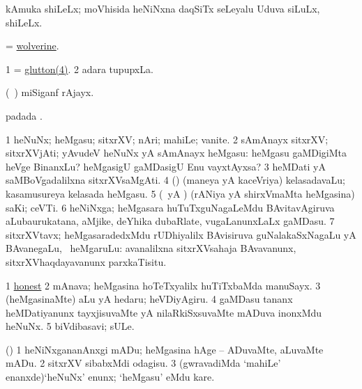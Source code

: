 \bentry
{} 
\gl{\nA}
\expl{}
\bmng
kAmuka shiLeLx; moVhisida heNiNxna daqSiTx seLeyalu Uduva siLuLx, shiLeLx. 
\emng
\eentry

\bentry
{} 
\gl{\nA}
\expl{}
\bmng
= \hyperlink{wolverine}{wolverine}. 
\emng
\eentry

\bentry
{} 
\gl{\nA}
\expl{}
\bmng
\bnum
\num{1} = \hyperref{kandict_g.pdf}{G}{glutton(4)}{glutton(4)}. 
\num{2} adara tupupxLa. 
\enum
\emng
\eentry

\bentry
{} 
\gl{\nA}
\expl{}
\bmng
(\kanu\ \ame) miSiganf rAjayx. 
\emng
\eentry

\bentry
{} 
\gl{\nA}
\expl{}
\bmng
{} padada \bava. 
\emng
\eentry

\bentry
{} 
\gl{\nA}
\bmng
\bnum
\num{1} heNuNx; heMgasu; sitxrXV; nAri; mahiLe; vanite. 
\num{2} sAmAnayx sitxrXV; sitxrXVjAti; yAvudeV heNuNx yA sAmAnayx heMgasu:  heMgasu gaMDigiMta heVge BinanxLu? heMgasigU gaMDasigU Enu vayxtAyxsa? 
\num{3} heMDati yA saMBoVgadalilxna sitxrXVsaMgAti. 
\num{4} (\AmA) (maneya yA kaceVriya) kelasadavaLu; kasamusureya kelasada heMgasu. 
\num{5} (\ca\ yA \pArxparx) (rANiya yA shirxVmaMta heMgasina) saKi; ceVTi. 
\num{6} heNiNxga; heMgasara huTuTxguNagaLeMdu BAvitavAgiruva aLubaurukatana, aMjike, deYhika dubaRlate, \mo vugaLanunxLaLx gaMDasu. 
\num{7} sitxrXVtavx; heMgasaradedxMdu rUDhiyalilx BAvisiruva guNalakaSxNagaLu yA BAvanegaLu, \udA\ heMgaruLu:  avanalilxna sitxrXVsahaja BAvavanunx, sitxrXVhaqdayavanunx parxkaTisitu. 
\enum
\emng

\noindent
\gl{\pagu}
\expl{}
\bmng
\bnum
\num{1}  \hyperref{kandict_h.pdf}{H}{honest nuga}{honest}  
\num{2}  mAnava; heMgasina hoTeTxyalilx huTiTxbaMda manuSayx. 
\num{3}  (heMgasinaMte) aLu yA hedaru; heVDiyAgiru. 
\num{4}  gaMDasu tananx heMDatiyanunx tayxjisuvaMte yA nilaRkiSxsuvaMte mADuva inonxMdu heNuNx. 
\num{5}  biVdibasavi; sULe. 
\enum
\emng
\eentry

\bentry
{} 
\gl{\sakirx}
\expl{}
\bmng
(\pArxparx) 
\bnum
\num{1} heNiNxgananAnxgi mADu; heMgasina hAge -- ADuvaMte, aLuvaMte mADu. 
\num{2} sitxrXV sibabxMdi odagisu. 
\num{3} (gwravadiMda `mahiLe' enanxde)`heNuNx' enunx; `heMgasu' eMdu kare. 
\enum
\emng
\eentry

